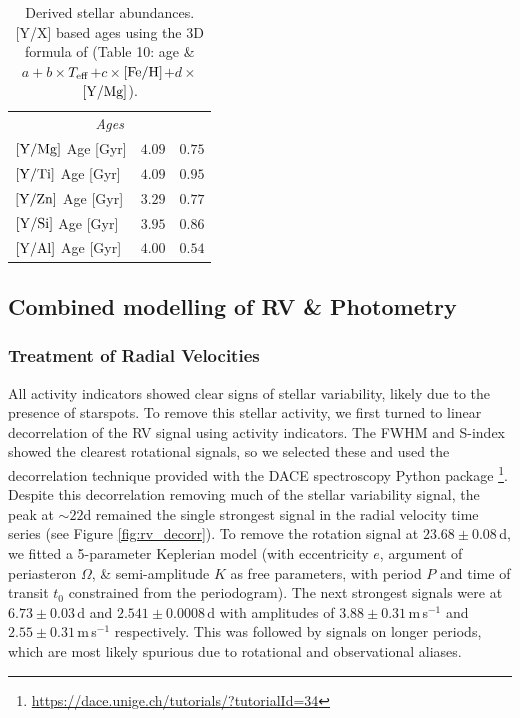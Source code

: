 \documentclass[fleqn,usenatbib]{mnras}
\newcommand{\ms}{m\,s$^{-1}$}
\newcommand{\teff}{$T_{\rm eff}$}
\newcommand{\feh}{\mbox{$\rm [Fe/H]$}}
\newcommand{\ymg}{\mbox{$\rm [Y/Mg]$}}
\begin{document}
\begin{table}
\begin{tabular}{lcc}
        \hline
        \multicolumn{3}{c}{\it Ages}\\
        $[\rm{Y}/\rm{Mg}]$ Age [Gyr]  & $ 4.09 $ & $ 0.75 $ \\
        $[\rm{Y}/\rm{Ti}]$ Age [Gyr]  & $ 4.09 $ & $ 0.95 $ \\
        $[\rm{Y}/\rm{Zn}]$ Age [Gyr]  & $ 3.29 $ & $ 0.77 $ \\
        $[\rm{Y}/\rm{Si}]$ Age [Gyr]  & $ 3.95 $ & $ 0.86 $ \\
        $[\rm{Y}/\rm{Al}]$ Age [Gyr]  & $ 4.00 $ & $ 0.54 $ \\
        \hline
        \hline
    \end{tabular}
    \caption{Derived stellar abundances. [Y/X] based ages using the 3D formula of \citet{Delgado-19} (Table 10: age \&  $a + b \times$\teff{}$+ c \times$\feh{}$ + d \times$\ymg{}).}
    \label{tab:abunds}
\end{table}


\subsection{Combined modelling of RV \& Photometry}

\subsubsection{Treatment of Radial Velocities}\label{sect:rvs}
All activity indicators showed clear signs of stellar variability, likely due to the presence of starspots.
To remove this stellar activity, we first turned to linear decorrelation of the RV signal using activity indicators.
The FWHM and S-index showed the clearest rotational signals, so we selected these and used the decorrelation technique provided with the DACE spectroscopy Python package \citep{2015ASPC..495....7B}\footnote{\url{https://dace.unige.ch/tutorials/?tutorialId=34}}.
Despite this decorrelation removing much of the stellar variability signal, the peak at $\sim22$d remained the single strongest signal in the radial velocity time series (see Figure \ref{fig:rv_decorr}).
To remove the rotation signal at $23.68\pm0.08$\,d, we fitted a 5-parameter Keplerian model (with eccentricity $e$, argument of periasteron $\Omega$, \& semi-amplitude $K$ as free parameters, with period $P$ and time of transit $t_0$ constrained from the periodogram).
The next strongest signals were at $6.73\pm0.03$\,d and $2.541\pm0.0008$\,d with amplitudes of $3.88\pm0.31$\,\ms{} and $2.55\pm0.31$\,\ms{} respectively. This was followed by signals on longer periods, which are most likely spurious due to rotational and observational aliases.
\end{document}

